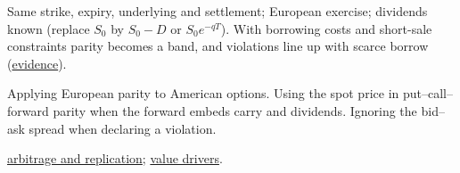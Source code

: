 \begin{qfresult}
 Same strike, expiry, underlying and settlement; European exercise; dividends known (replace $S_0$ by $S_0-D$ or $S_0e^{-qT}$). With borrowing costs and short-sale constraints parity becomes a band, and violations line up with scarce borrow (\hyperref[res:synthetic-short-put-call]{evidence}).

 Applying European parity to American options. Using the spot price in put--call--forward parity when the forward embeds carry and dividends. Ignoring the bid--ask spread when declaring a violation.

 \hyperref[meth:arbitrage-replication-carry]{arbitrage and replication}; \hyperref[def:option-value-drivers]{value drivers}.

\end{qfresult}

